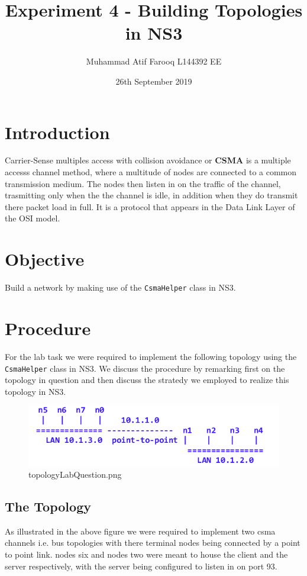 \documentclass[fullpage]{article}
\begin{document}
   \title{Experiment 4 - Building Topologies in NS3}

   \author{Muhammad Atif Farooq L144392 EE}

   \date{26th September 2019}

   \maketitle

\section{Introduction}
Carrier-Sense multiples access with collision avoidance or \textbf{CSMA} is a multiple
accesss channel method, where a multitude of nodes are connected to a common transmission
medium. The nodes then listen in on the traffic of the channel, trasmitting only when the
the channel is idle, in addition when they do transmit there packet load in full. It
is a protocol that appears in the Data Link Layer of the OSI model.

\section{Objective}
Build a network by making use of the \verb|CsmaHelper| class in NS3.

\section{Procedure}
For the lab task we were required to implement the following topology using the
\verb|CsmaHelper| class in NS3. We discuss the procedure by remarking first on the topology
in question and then discuss the stratedy we employed to realize this topology in NS3.

\begin{figure}[H]
  \includegraphics[width=\linewidth]{topologyLabQuestion.png}
  \caption{topologyLabQuestion.png}
  \label{fig:output1}
\end{figure}

\subsection{The Topology}
As illustrated in the above figure we were required to implement two csma channels
i.e. bus topologies with there terminal nodes being connected by a point to point link.
nodes six and nodes two were meant to house the client and the server respectively, with
the server being configured to listen in on port 93.
\end{document}
